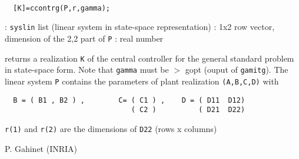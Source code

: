 \begin{mandesc}
   \\ %
\end{mandesc}
\begin{calling_sequence}
\begin{verbatim}
  [K]=ccontrg(P,r,gamma);  
\end{verbatim}
\end{calling_sequence}
\begin{parameters}
  \begin{varlist}
    : \verb!syslin! list (linear system in state-space representation)
    : 1x2 row vector, dimension of the 2,2 part of \verb!P!
    : real number
  \end{varlist}
\end{parameters}
\begin{mandescription}
  returns a realization \verb!K! of the central controller for the
  general standard problem in state-space form.
  Note that \verb!gamma! must be $>$ gopt (ouput of \verb!gamitg!).
  The linear system \verb!P! contains the parameters of plant realization \verb!(A,B,C,D)!
  with
\begin{verbatim}
  B = ( B1 , B2 ) ,        C= ( C1 ) ,    D = ( D11  D12)
                              ( C2 )          ( D21  D22)
\end{verbatim}
\verb!r(1)! and \verb!r(2)! are the dimensions of \verb!D22! (rows x columns)
\end{mandescription}
\begin{manseealso}
     
\end{manseealso}
\begin{authors}
  P. Gahinet (INRIA)
\end{authors}
